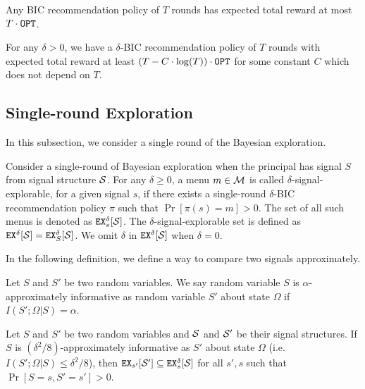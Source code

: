 \begin{claim}
Any BIC recommendation policy of $T$ rounds has expected total reward at most $T \cdot\OPT$.  
\end{claim}

\begin{theorem}
\label{thm:private_nocc}
For any $\delta > 0$, we have a $\delta$-BIC recommendation policy of $T$ rounds with expected total reward at least $\left(T - C\cdot \log(T) \right) \cdot \OPT$ for some constant $C$ which does not depend on $T$. 
\end{theorem}


\subsection{Single-round Exploration}
\label{sec:private_single}

In this subsection, we consider a single round of the Bayesian exploration. 

\begin{definition}
Consider a single-round of Bayesian exploration when the principal has signal $S$ from signal structure $\S$. For any $\delta \geq 0$, a menu $m \in \M$ is called $\delta$-signal-explorable, for a given signal $s$, if there exists a single-round $\delta$-BIC recommendation policy $\pi$ such that $\Pr[\pi(s) = m] > 0$. The set of all such menus is denoted as $\EX^{\delta}_s[\S]$. The $\delta$-signal-explorable set is defined as $\EX^{\delta}[\S] = \EX^{\delta}_S[\S]$. We omit $\delta$ in $\EX^{\delta}[\S]$ when $\delta = 0$. 
\end{definition}

In the following definition, we define a way to compare two signals approximately. 
\begin{definition}
Let $S$ and $S'$ be two random variables. We say random variable $S$ is $\alpha$-approximately informative as random variable $S'$ about state $\Omega$ if $I(S' ; \Omega|S) = \alpha$. 
\end{definition}

\begin{lemma} 
\label{lem:ainfomono}
Let $S$ and $S'$ be two random variables and $\S$ and $\S'$ be their signal structures. If $S$ is $(\delta^2/8)$-approximately informative as $S'$ about state $\Omega$ (i.e. $I(S' ; \Omega|S) \leq \delta^2/8$), then $\EX_{s'}[\S'] \subseteq \EX^{\delta}_s[\S]$  for all $s' ,s$ such that $\Pr[S= s, S'= s'] > 0$.
\end{lemma}

